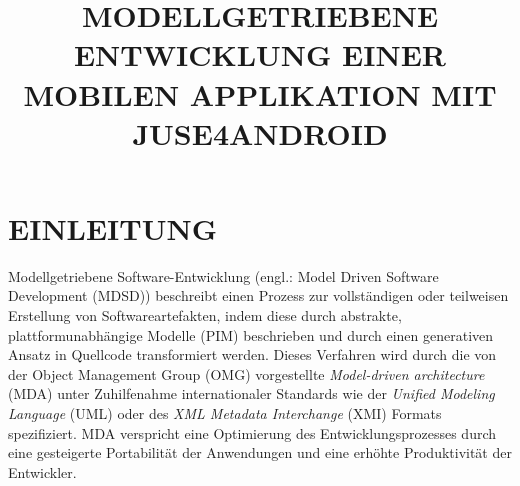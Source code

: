 \documentclass[a4paper,twoside]{article}
\begin{document}
\title{\uppercase{Modellgetriebene Entwicklung einer mobilen Applikation mit JUSE4Android}}

\author{
}



\onecolumn \maketitle \normalsize \vfill

\section{\uppercase{Einleitung}}
\label{sec:introduction}
\noindent Modellgetriebene Software-Entwicklung (engl.: Model Driven Software Development (MDSD))  beschreibt einen Prozess zur vollständigen oder teilweisen Erstellung von Softwareartefakten, indem diese durch abstrakte, plattformunabhängige Modelle (PIM) beschrieben und durch einen generativen Ansatz in Quellcode transformiert werden. Dieses Verfahren wird durch die von der Object Management Group (OMG) vorgestellte \textit{Model-driven architecture} (MDA) unter Zuhilfenahme internationaler Standards wie der \textit{Unified Modeling Language} (UML) oder des \textit{XML Metadata Interchange} (XMI) Formats spezifiziert. MDA verspricht eine Optimierung des Entwicklungsprozesses durch eine gesteigerte Portabilität der Anwendungen und eine erhöhte Produktivität der Entwickler.\citep{OMG_MDA}
\\
\end{document}
